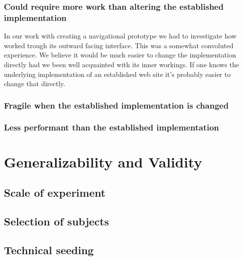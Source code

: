 \subsubsection{Could require more work than altering the established
  implementation}

In our work with creating a navigational prototype we had to investigate how
\urort{} worked trough its outward facing interface. This was a somewhat
convoluted experience.
We believe it would be much easier to change the \urort{} implementation
directly had we been well acquainted with its inner workings.
If one knows the underlying implementation of an established web site it's
probably easier to change that directly.

\subsubsection{Fragile when the established implementation is changed}

\subsubsection{Less performant than the established implementation}

\section{Generalizability and Validity}

\subsection{Scale of experiment}


\subsection{Selection of subjects}


\subsection{Technical seeding}

